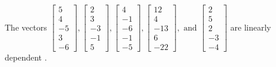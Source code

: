 \begin{exercise}
\begin{exerciseStatement}
  \end{exerciseStatement}
  \begin{exerciseAnswer}
   The vectors \(\left[\begin{array}{r}
5 \\
4 \\
-5 \\
3 \\
-6
\end{array}\right] , \left[\begin{array}{r}
2 \\
3 \\
-3 \\
-1 \\
5
\end{array}\right] , \left[\begin{array}{r}
4 \\
-1 \\
-6 \\
-1 \\
-5
\end{array}\right] , \left[\begin{array}{r}
12 \\
4 \\
-13 \\
6 \\
-22
\end{array}\right] , \text{ and } \left[\begin{array}{r}
2 \\
5 \\
2 \\
-3 \\
-4
\end{array}\right]\) are 
  	 linearly dependent  .
  


  \end{exerciseAnswer}
\end{exercise}